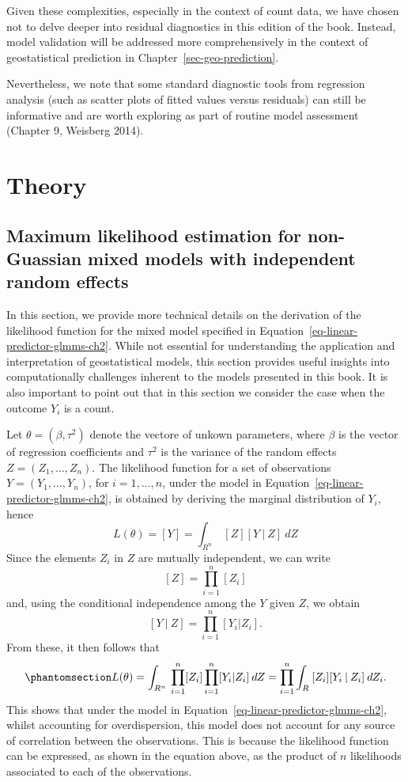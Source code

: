 \documentclass[
  letterpaper,
]{krantz}
\begin{document}
Given these complexities, especially in the context of count data, we
have chosen not to delve deeper into residual diagnostics in this
edition of the book. Instead, model validation will be addressed more
comprehensively in the context of geostatistical prediction in
Chapter~\ref{sec-geo-prediction}.

Nevertheless, we note that some standard diagnostic tools from
regression analysis (such as scatter plots of fitted values versus
residuals) can still be informative and are worth exploring as part of
routine model assessment (Chapter 9, Weisberg 2014).

\section{Theory}\label{theory}

\subsection{Maximum likelihood estimation for non-Guassian mixed models
with independent random
effects}\label{maximum-likelihood-estimation-for-non-guassian-mixed-models-with-independent-random-effects}

In this section, we provide more technical details on the derivation of
the likelihood function for the mixed model specified in
Equation~\ref{eq-linear-predictor-glmms-ch2}. While not essential for
understanding the application and interpretation of geostatistical
models, this section provides useful insights into computationally
challenges inherent to the models presented in this book. It is also
important to point out that in this section we consider the case when
the outcome \(Y_i\) is a count.

Let \(\theta = (\beta, \tau^2)\) denote the vectore of unkown
parameters, where \(\beta\) is the vector of regression coefficients and
\(\tau^2\) is the variance of the random effects
\(Z = (Z_1, \ldots, Z_n)\). The likelihood function for a set of
observations \(Y = (Y_1, \ldots, Y_n)\), for \(i=1,\ldots,n\), under the
model in Equation~\ref{eq-linear-predictor-glmms-ch2}, is obtained by
deriving the marginal distribution of \(Y_i\), hence \[
L(\theta) = [Y] = \int_{R^n} \: [Z] [Y \:|\: Z] \: d Z
\] Since the elements \(Z_i\) in \(Z\) are mutually independent, we can
write \[
[Z] = \prod_{i=1}^n [Z_i]
\] and, using the conditional independence among the \(Y\) given \(Z\),
we obtain \[
[Y \:|\: Z] = \prod_{i=1}^n [Y_i | Z_i].
\] From these, it then follows that
\begin{equation}\phantomsection\label{eq-glmm-final}{
L(\theta) = \int_{R^n} \: \prod_{i=1}^n [Z_i] \prod_{i=1}^n [Y_i | Z_i] \: d Z = \prod_{i=1}^n \int_{R} \: [Z_i] [Y_i \:|\: Z_i] \: d Z_i.
}\end{equation} This shows that under the model in
Equation~\ref{eq-linear-predictor-glmms-ch2}, whilst accounting for
overdispersion, this model does not account for any source of
correlation between the observations. This is because the likelihood
function can be expressed, as shown in the equation above, as the
product of \(n\) likelihoods associated to each of the observations.
\end{document}
